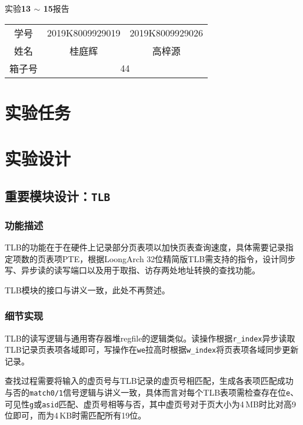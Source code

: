 \documentclass[UTF-8,twoside,c5size]{ctexart}
\begin{document}
	\begin{center}
		\heiti{}
		实验\textbf{13 $ \bm\sim $ 15}报告
	\end{center}

	\begin{table*}[!h]
		\raggedleft
		\begin{tabular}{ccc}
			{\heiti 学号} & {2019K8009929019} & {2019K8009929026} \\
			{\heiti 姓名} & 桂庭辉 & 高梓源 \\
			{\heiti 箱子号} & \multicolumn{2}{c}{44}
		\end{tabular}
	\end{table*}
	
	\section{实验任务}
    
	
	\section{实验设计}	
	\subsection{重要模块设计：\texttt{TLB}}
    \subsubsection{功能描述}
    TLB的功能在于在硬件上记录部分页表项以加快页表查询速度，具体需要记录指定项数的页表项PTE，根据LoongArch 32位精简版TLB需支持的指令，设计同步写、异步读的读写端口以及用于取指、访存两处地址转换的查找功能。
    
    TLB模块的接口与讲义一致，此处不再赘述。
    
    \subsubsection{细节实现}
    
    TLB的读写逻辑与通用寄存器堆regfile的逻辑类似。读操作根据\texttt{r\_index}异步读取TLB记录页表项各域即可，写操作在\texttt{we}拉高时根据\texttt{w\_index}将页表项各域同步更新记录。
    
    查找过程需要将输入的虚页号与TLB记录的虚页号相匹配，生成各表项匹配成功与否的\texttt{match0/1}信号逻辑与讲义一致，具体而言对每个TLB表项需检查存在位\texttt{e}、可见性\texttt{g}或\texttt{asid}匹配、虚页号相等与否，其中虚页号对于页大小为4\,MB时比对高9位即可，而为4\,KB时需匹配所有19位。
    
\end{document}
